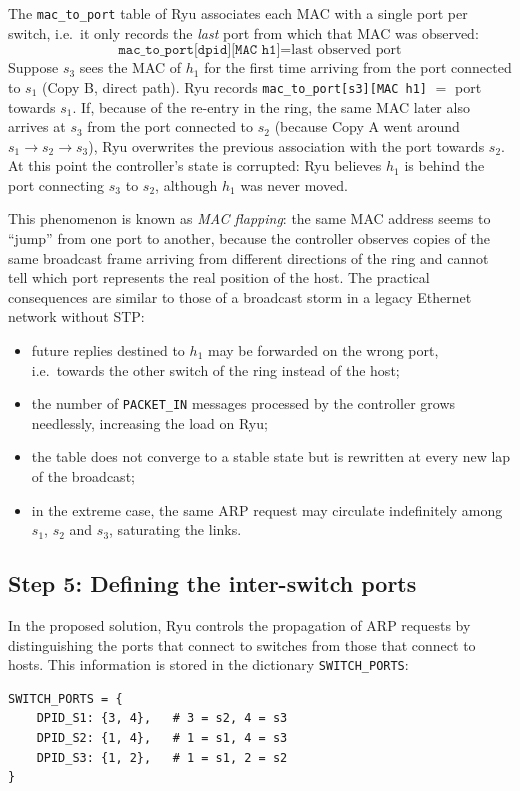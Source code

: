 \documentclass[11pt,a4paper]{article}
\newcommand{\code}[1]{\texttt{#1}}
\begin{document}
The \code{mac\_to\_port} table of Ryu associates each MAC with a single port per
switch, i.e.\ it only records the \emph{last} port from which that MAC was
observed:
\[
  \code{mac\_to\_port[dpid][MAC h1]} = \text{last observed port}
\]
Suppose $s_3$ sees the MAC of $h_1$ for the first time arriving from the port
connected to $s_1$ (Copy B, direct path). Ryu records
\code{mac\_to\_port[s3][MAC h1]} $=$ port towards $s_1$. If, because of the
re-entry in the ring, the same MAC later also arrives at $s_3$ from the port
connected to $s_2$ (because Copy A went around $s_1\to s_2\to s_3$), Ryu
overwrites the previous association with the port towards $s_2$. At this point
the controller's state is corrupted: Ryu believes $h_1$ is behind the port
connecting $s_3$ to $s_2$, although $h_1$ was never moved.

This phenomenon is known as \emph{MAC flapping}: the same MAC address seems to
``jump'' from one port to another, because the controller observes copies of the
same broadcast frame arriving from different directions of the ring and cannot
tell which port represents the real position of the host. The practical
consequences are similar to those of a broadcast storm in a legacy Ethernet
network without STP:
\begin{itemize}
  \item future replies destined to $h_1$ may be forwarded on the wrong port, i.e.\
        towards the other switch of the ring instead of the host;
  \item the number of \code{PACKET\_IN} messages processed by the controller
        grows needlessly, increasing the load on Ryu;
  \item the table does not converge to a stable state but is rewritten at every
        new lap of the broadcast;
  \item in the extreme case, the same ARP request may circulate indefinitely
        among $s_1$, $s_2$ and $s_3$, saturating the links.
\end{itemize}

\subsection{Step 5: Defining the inter-switch ports}
In the proposed solution, Ryu controls the propagation of ARP requests by
distinguishing the ports that connect to switches from those that connect to
hosts. This information is stored in the dictionary \code{SWITCH\_PORTS}:

\begin{lstlisting}[style=py,caption={Inter-switch ports used to control ARP flooding}]
SWITCH_PORTS = {
    DPID_S1: {3, 4},   # 3 = s2, 4 = s3
    DPID_S2: {1, 4},   # 1 = s1, 4 = s3
    DPID_S3: {1, 2},   # 1 = s1, 2 = s2
}
\end{lstlisting}
\end{document}
